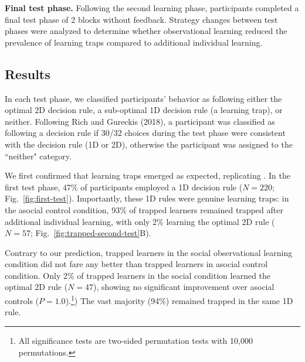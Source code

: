 \documentclass[11pt]{article} %
\begin{document}
\textbf{Final test phase.} Following the second learning phase, participants completed a final test phase of 2 blocks without feedback. Strategy changes between test phases were analyzed to determine whether observational learning reduced the prevalence of learning traps compared to additional individual learning.


\subsection{Results}

In each test phase, we classified participants' behavior as following either the optimal 2D decision rule, a sub-optimal 1D decision rule (a learning trap), or neither. Following Rich and Gureckis (2018), a participant was classified as following a decision rule if 30/32 choices during the test phase were consistent with the decision rule (1D or 2D), otherwise the participant was assigned to the ``neither" category. %

We first confirmed that learning traps emerged as expected, replicating \citeauthor{richLimitsLearningExploration2018} \citeyear{richLimitsLearningExploration2018}. In the first test phase, 47\% of participants employed a 1D decision rule ($N=220$; Fig.~\ref{fig:first-test}). Importantly, these 1D rules were genuine learning traps: in the asocial control condition, 93\% of trapped learners remained trapped after additional individual learning, with only 2\% learning the optimal 2D rule ($N=57$; Fig.~\ref{fig:trapped-second-test}B).

Contrary to our prediction, trapped learners in the social observational learning condition did not fare any better than trapped learners in asocial control condition. Only 2\% of trapped learners in the social condition learned the optimal 2D rule ($N = 47$), showing no significant improvement over asocial controls ($P = 1.0$).\footnote{All significance tests are two-sided permutation tests with 10,000 permutations.}) The vast majority (94\%) remained trapped in the same 1D rule. 
\end{document}
